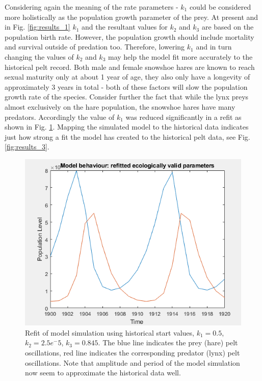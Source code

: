\documentclass{article}
\begin{document}
Considering again the meaning of the rate parameters - $k_1$ could be considered more holistically as the population growth parameter of the prey. At present and in Fig. \ref{fig:results_1} $k_1$ and the resultant values for $k_2$ and $k_3$ are based on the population birth rate. However, the population growth should include mortality and survival outside of predation too. Therefore, lowering $k_1$ and in turn changing the values of $k_2$ and $k_3$ may help the model fit more accurately to the historical pelt record. 
Both male and female snowshoe hares are known to reach sexual maturity only at about 1 year of age, they also only have a longevity of approximately 3 years in total - both of these factors will slow the population growth rate of the species. Consider further the fact that while the lynx preys almost exclusively on the hare population, the snowshoe hares have many predators. Accordingly the value of $k_1$ was reduced significantly in a refit as shown in Fig. \ref{fig:results_2}. Mapping the simulated model to the historical data indicates just how strong a fit the model has created to the historical pelt data, see Fig. \ref{fig:results_3}.

\begin{figure}[H]
    \includegraphics[width = \textwidth]{results_2.PNG}
    \caption{Refit of model simulation using historical start values, $k_1 = 0.5$, $k_2 = 2.5e^-5$, $k_3 = 0.845$. The blue line indicates the prey (hare) pelt oscillations, red line indicates the corresponding predator (lynx) pelt oscillations. Note that amplitude and period of the model simulation now seem to approximate the historical data well.}
    \label{fig:results_2}
\end{figure}
\end{document}
